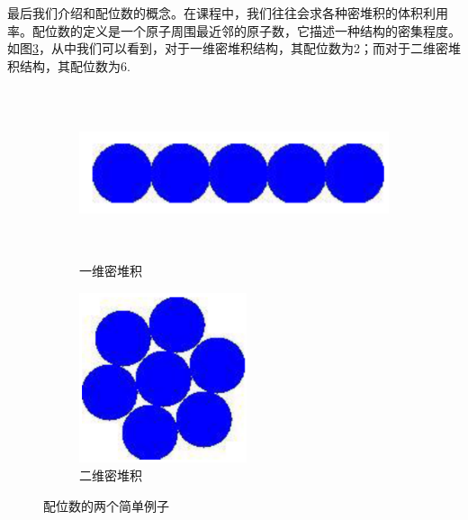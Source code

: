 \documentclass{ctexart}
\begin{document}
    最后我们介绍和配位数的概念。在课程中，我们往往会求各种密堆积的体积利用率。配位数的定义是一个原子周围最近邻的原子数，它描述一种结构的密集程度。如图\ref{fig:coordinatenumber_example}，从中我们可以看到，对于一维密堆积结构，其配位数为2；而对于二维密堆积结构，其配位数为6.
    \begin{figure}[H]
        \begin{subfigure}{0.5\textwidth}
        \includegraphics[width=0.9\linewidth, height=5cm]{figure/CN_1D.png} 
        \caption{一维密堆积}
        \label{fig:CN_1D}
        \end{subfigure}
        \begin{subfigure}{0.5\textwidth}
        \includegraphics[width=0.9\linewidth, height=5cm]{figure/CN_2D.png}
        \caption{二维密堆积}
        \label{fig:CN_2D}
        \end{subfigure}
        
        \caption{配位数的两个简单例子}
        \label{fig:coordinatenumber_example}
        \end{figure}
    
    
    
\end{document}
